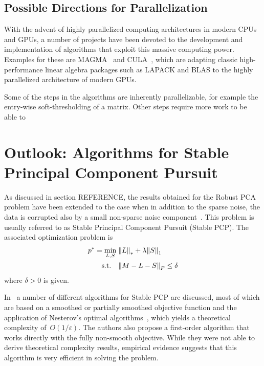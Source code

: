 \documentclass{../../common/projectreport}
\begin{document}
\subsection{Possible Directions for Parallelization}
\label{Algorithms:Discussion:Parallel:Subsec}

With the advent of highly parallelized computing architectures in modern CPUs and GPUs, a number of projects have been devoted to the development and implementation of algorithms that exploit this massive computing power. Examples for these are MAGMA~\cite{Smith:2010tg} and CULA~\cite{Humphrey:2010kl}, which are adapting classic high-performance linear algebra packages such as LAPACK and BLAS to the highly parallelized architecture of modern GPUs. 

Some of the steps in the algorithms are inherently parallelizable, for example the entry-wise soft-thresholding of a matrix. Other steps require more work to be able to 

\cite{Boyd:2011hc}



\section{Outlook: Algorithms for Stable Principal Component Pursuit}
\label{Algorithms:StablePCP:Sec}

As discussed in section REFERENCE, the results obtained for the Robust PCA problem have been extended to the case when in addition to the sparse noise, the data is corrupted also by a small non-sparse noise component~\cite{Zhou:2010vn}. This problem is usually referred to as Stable Principal Component Pursuit (Stable PCP). The associated optimization problem is 
%
\begin{align}
\begin{split}
p^* = \min_{L,S} \; &{\left\|L\right\|}_{*}^{} + \lambda {\left\|S\right\|}_{1}^{} \\
\text{s.t.} \quad &{\left\|M - L - S\right\|}_{F}^{} \leq \delta
\end{split}
\label{Algorithms:StablePCP:StablePCP}
\end{align}
%
where $\delta>0$ is given. 

In~\cite{Aybat:2011vn} a number of different algorithms for Stable PCP are discussed, most of which are based on a smoothed or partially smoothed objective function and the application of Nesterov's optimal algorithms~\cite{Nesterov:2005fk}, which yields a theoretical complexity of~$O(1/\varepsilon)$. The authors also propose a first-order algorithm that works directly with the fully non-smooth objective. While they were not able to derive theoretical complexity results, empirical evidence suggests that this algorithm is very efficient in solving the problem. 









\end{document}
